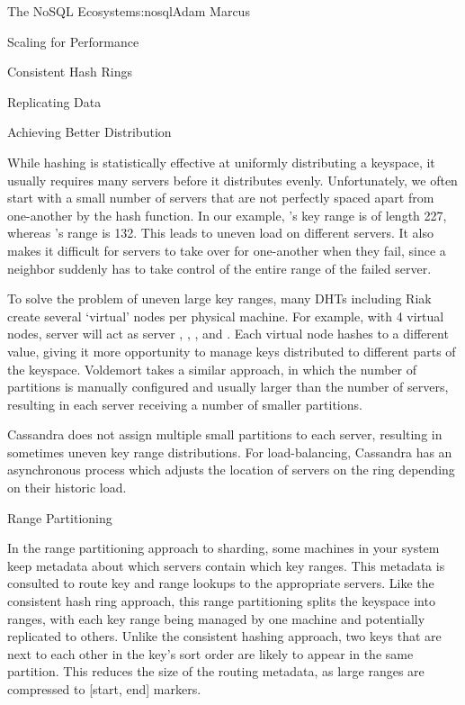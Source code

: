 \begin{aosachapter}{The NoSQL Ecosystem}{s:nosql}{Adam Marcus}
\begin{aosasect1}{Scaling for Performance}
\begin{aosasect2}{Consistent Hash Rings}
\begin{aosasect3}{Replicating Data}
\end{aosasect3}

\begin{aosasect3}{Achieving Better Distribution}

While hashing is statistically effective at uniformly distributing a
keyspace, it usually requires many servers before it distributes
evenly.  Unfortunately, we often start with a small number of servers
that are not perfectly spaced apart from one-another by the hash
function.  In our example, 's key range is of length 227,
whereas 's range is 132.  This leads to uneven load on
different servers.  It also makes it difficult for servers to take
over for one-another when they fail, since a neighbor suddenly has to
take control of the entire range of the failed server.

To solve the problem of uneven large key ranges, many DHTs including
Riak create several `virtual' nodes per physical machine.  For
example, with 4 virtual nodes, server  will act as server
, , , and .  Each virtual
node hashes to a different value, giving it more opportunity to manage
keys distributed to different parts of the keyspace.  Voldemort takes
a similar approach, in which the number of partitions is manually
configured and usually larger than the number of servers, resulting in
each server receiving a number of smaller partitions.

Cassandra does not assign multiple small partitions to each server,
resulting in sometimes uneven key range distributions.  For
load-balancing, Cassandra has an asynchronous process which adjusts
the location of servers on the ring depending on their historic load.

\end{aosasect3}

\end{aosasect2}

\vspace{-0.2cm} %
\begin{aosasect2}{Range Partitioning}
\vspace{-0.1cm} %

In the range partitioning approach to sharding, some machines in your
system keep metadata about which servers contain which key ranges.
This metadata is consulted to route key and range lookups to the
appropriate servers.  Like the consistent hash ring approach, this
range partitioning splits the keyspace into ranges, with each key
range being managed by one machine and potentially replicated to
others.  Unlike the consistent hashing approach, two keys that are
next to each other in the key's sort order are likely to appear in the
same partition.  This reduces the size of the routing metadata, as
large ranges are compressed to [start, end] markers.


\end{aosasect2}
\end{aosasect1}
\end{aosachapter}
